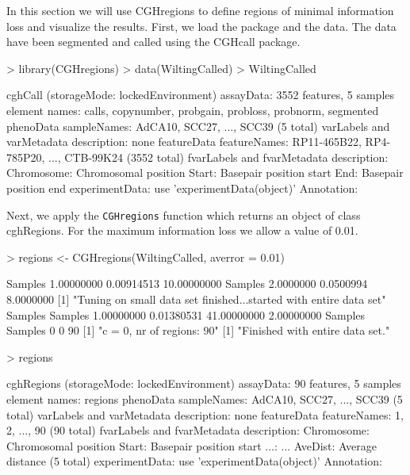 \documentclass[11pt]{article}
\begin{document}
In this section we will use CGHregions to define regions of minimal information loss and visualize the results. First, we load the package and the data. The data have been segmented and called using the CGHcall package.

\begin{Schunk}
\begin{Sinput}
> library(CGHregions)
> data(WiltingCalled)
> WiltingCalled
\end{Sinput}
\begin{Soutput}
cghCall (storageMode: lockedEnvironment)
assayData: 3552 features, 5 samples 
  element names: calls, copynumber, probgain, probloss, probnorm, segmented 
phenoData
  sampleNames: AdCA10, SCC27, ..., SCC39  (5 total)
  varLabels and varMetadata description: none
featureData
  featureNames: RP11-465B22, RP4-785P20, ..., CTB-99K24  (3552 total)
  fvarLabels and fvarMetadata description:
    Chromosome: Chromosomal position
    Start: Basepair position start
    End: Basepair position end
experimentData: use 'experimentData(object)'
Annotation:  
\end{Soutput}
\end{Schunk}

\noindent
Next, we apply the {\tt CGHregions} function which returns an object of class cghRegions. For the maximum information loss we allow a value of 0.01.

\begin{Schunk}
\begin{Sinput}
> regions <- CGHregions(WiltingCalled, averror = 0.01)
\end{Sinput}
\begin{Soutput}
                Samples             
 1.00000000  0.00914513 10.00000000 
            Samples           
2.0000000 0.0500994 8.0000000 
[1] "Tuning on small data set finished...started with entire data set"
    Samples     Samples                         
 1.00000000  0.01380531 41.00000000  2.00000000 
Samples Samples         
      0       0      90 
[1] "c = 0, nr of regions: 90"
[1] "Finished with entire data set."
\end{Soutput}
\begin{Sinput}
> regions
\end{Sinput}
\begin{Soutput}
cghRegions (storageMode: lockedEnvironment)
assayData: 90 features, 5 samples 
  element names: regions 
phenoData
  sampleNames: AdCA10, SCC27, ..., SCC39  (5 total)
  varLabels and varMetadata description: none
featureData
  featureNames: 1, 2, ..., 90  (90 total)
  fvarLabels and fvarMetadata description:
    Chromosome: Chromosomal position
    Start: Basepair position start
    ...: ...
    AveDist: Average distance
    (5 total)
experimentData: use 'experimentData(object)'
Annotation:  
\end{Soutput}
\end{Schunk}
\end{document}
